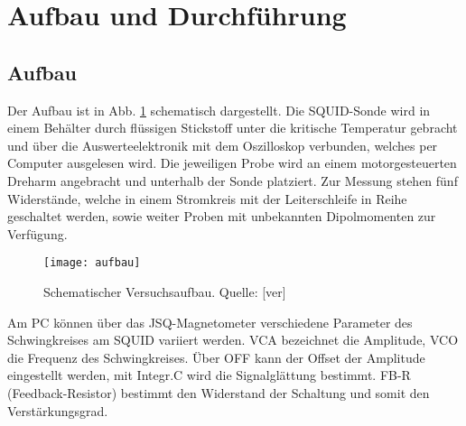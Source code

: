 \clearpage
\section{Aufbau und Durchführung}
\subsection{Aufbau}
Der Aufbau ist in Abb. \ref{fig:aufbau} schematisch dargestellt. Die SQUID-Sonde wird in einem Behälter durch flüssigen Stickstoff unter die kritische Temperatur gebracht und über die Auswerteelektronik mit dem Oszilloskop verbunden, welches per Computer ausgelesen wird. Die jeweiligen Probe wird an einem motorgesteuerten Dreharm angebracht und unterhalb der Sonde platziert. Zur Messung stehen fünf Widerstände, welche in einem Stromkreis mit der Leiterschleife in Reihe geschaltet werden, sowie weiter Proben mit unbekannten Dipolmomenten zur Verfügung.\\
\begin{figure}[h]
\begin{center}
\texttt{[image: aufbau]}
\caption{Schematischer Versuchsaufbau. Quelle: [ver]}
\label{fig:aufbau}
\end{center}
\end{figure}
Am PC können über das JSQ-Magnetometer verschiedene Parameter des Schwingkreises am SQUID variiert werden. VCA bezeichnet die Amplitude, VCO die Frequenz des Schwingkreises. Über OFF kann der Offset der Amplitude eingestellt werden, mit Integr.C wird die Signalglättung bestimmt. FB-R (Feedback-Resistor) bestimmt den Widerstand der Schaltung und somit den Verstärkungsgrad.
